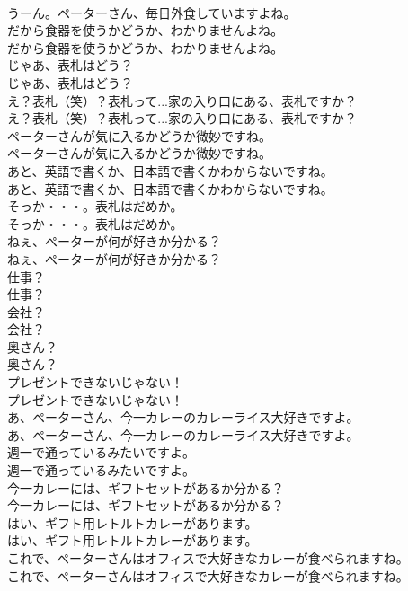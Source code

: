 \documentclass[8pt]{extreport}
\begin{document}
\begin{CJK}{UTF8}{min}
\\	うーん。ペーターさん、毎日外食していますよね。 
\\	だから食器を使うかどうか、わかりませんよね。	
\\	だから食器を使うかどうか、わかりませんよね。 
\\	じゃあ、表札はどう？	
\\	じゃあ、表札はどう？ 
\\	え？表札（笑）？表札って...家の入り口にある、表札ですか？	
\\	え？表札（笑）？表札って...家の入り口にある、表札ですか？ 
\\	ペーターさんが気に入るかどうか微妙ですね。	
\\	ペーターさんが気に入るかどうか微妙ですね。 
\\	あと、英語で書くか、日本語で書くかわからないですね。	
\\	あと、英語で書くか、日本語で書くかわからないですね。 
\\	そっか・・・。表札はだめか。	
\\	そっか・・・。表札はだめか。 
\\	ねぇ、ぺーターが何が好きか分かる？	
\\	ねぇ、ぺーターが何が好きか分かる？ 
\\	仕事？	
\\	仕事？ 
\\	会社？	
\\	会社？ 
\\	奥さん？	
\\	奥さん？ 
\\	プレゼントできないじゃない！	
\\	プレゼントできないじゃない！ 
\\	あ、ペーターさん、今一カレーのカレーライス大好きですよ。	
\\	あ、ペーターさん、今一カレーのカレーライス大好きですよ。 
\\	週一で通っているみたいですよ。	
\\	週一で通っているみたいですよ。 
\\	今一カレーには、ギフトセットがあるか分かる？	
\\	今一カレーには、ギフトセットがあるか分かる？ 
\\	はい、ギフト用レトルトカレーがあります。	
\\	はい、ギフト用レトルトカレーがあります。 
\\	これで、ぺーターさんはオフィスで大好きなカレーが食べられますね。	
\\	これで、ぺーターさんはオフィスで大好きなカレーが食べられますね。 

\end{CJK}
\end{document}
